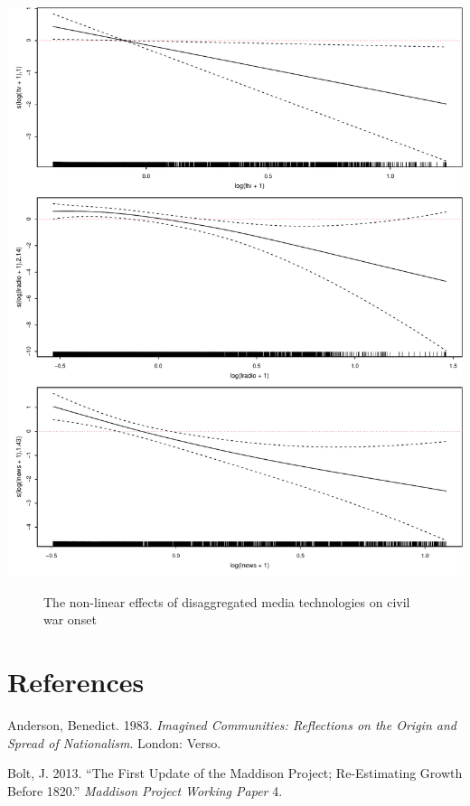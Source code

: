 \documentclass[11pt,article,oneside]{memoir}
\makeatletter
\def\maxwidth{\ifdim\Gin@nat@width>\linewidth\linewidth
\else\Gin@nat@width\fi}
\let\Oldincludegraphics\includegraphics
\renewcommand{\includegraphics}[1]{\Oldincludegraphics[width=\maxwidth]{#1}}
\makeatother
\begin{document}
\clearpage
\includegraphics{media_civil_war_files/figure-markdown/disaggregated-nonlinear.pdf}

\begin{figure}
\caption{The non-linear effects of disaggregated media technologies on civil war onset}  
\end{figure}

\pagebreak   

\section{References}\label{references}

\setlength{\parindent}{-0.2in} \setlength{\leftskip}{0.2in}
\setlength{\parskip}{8pt} \vspace*{-0.2in} \noindent

Anderson, Benedict. 1983. \emph{Imagined Communities: Reflections on the
Origin and Spread of Nationalism}. London: Verso.

Bolt, J. 2013. ``The First Update of the Maddison Project; Re-Estimating
Growth Before 1820.'' \emph{Maddison Project Working Paper} 4.
\end{document}
